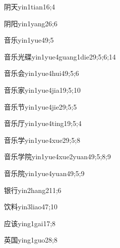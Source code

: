 \begin{verbete}{阴天}{yin1tian1}{6;4}
\end{verbete}
\begin{verbete}{阴阳}{yin1yang2}{6;6}
\end{verbete}
\begin{verbete}{音乐}{yin1yue4}{9;5}
\end{verbete}
\begin{verbete}{音乐光碟}{yin1yue4guang1die2}{9;5;6;14}
\end{verbete}
\begin{verbete}{音乐会}{yin1yue4hui4}{9;5;6}
\end{verbete}
\begin{verbete}{音乐家}{yin1yue4jia1}{9;5;10}
\end{verbete}
\begin{verbete}{音乐节}{yin1yue4jie2}{9;5;5}
\end{verbete}
\begin{verbete}{音乐厅}{yin1yue4ting1}{9;5;4}
\end{verbete}
\begin{verbete}{音乐学}{yin1yue4xue2}{9;5;8}
\end{verbete}
\begin{verbete}{音乐学院}{yin1yue4xue2yuan4}{9;5;8;9}
\end{verbete}
\begin{verbete}{音乐院}{yin1yue4yuan4}{9;5;9}
\end{verbete}
\begin{verbete}{银行}{yin2hang2}{11;6}
\end{verbete}
\begin{verbete}{饮料}{yin3liao4}{7;10}
\end{verbete}
\begin{verbete}{应该}{ying1gai1}{7;8}
\end{verbete}
\begin{verbete}{英国}{ying1guo2}{8;8}
\end{verbete}
